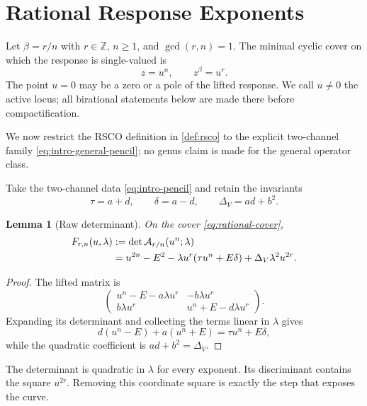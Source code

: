 \documentclass[11pt,reqno]{amsart}
\newtheorem{lemma}[theorem]{Lemma}
\theoremstyle{remark}
\newcommand{\Z}{\mathbb Z}
\newcommand{\cA}{\mathcal A}
\begin{document}
\section{Rational Response Exponents}\label{sec:rational-exponents}

Let $\beta=r/n$ with $r\in\Z$, $n\ge1$, and $\gcd(r,n)=1$.  The
minimal cyclic cover on which the response is single-valued is
\begin{equation}\label{eq:rational-cover}
 z=u^n,\qquad z^\beta=u^r.
\end{equation}
The point $u=0$ may be a zero or a pole of the lifted response.  We call
$u\ne0$ the active locus; all birational statements below are made there
before compactification.

We now restrict the RSCO definition in \cref{def:rsco} to the explicit
two-channel family \eqref{eq:intro-general-pencil}; no genus claim is made for
the general operator class.

Take the two-channel data \eqref{eq:intro-pencil} and retain the invariants
\begin{equation}\label{eq:invariants-repeat}
 \tau=a+d,\qquad \delta=a-d,\qquad \Delta_V=ad+b^2.
\end{equation}

\begin{lemma}[Raw determinant]\label{lem:raw-determinant}
On the cover \eqref{eq:rational-cover},
\begin{align}
 F_{r,n}(u,\lambda)
 &:=
 \det\cA_{r/n}(u^n;\lambda)\notag\\
 &=u^{2n}-E^2
 -\lambda u^r(\tau u^n+E\delta)
 +\Delta_V\lambda^2u^{2r}.
 \label{eq:raw-determinant}
\end{align}
\end{lemma}

\begin{proof}
The lifted matrix is
\[
 \begin{pmatrix}
 u^n-E-a\lambda u^r&-b\lambda u^r\\
 b\lambda u^r&u^n+E-d\lambda u^r
 \end{pmatrix}.
\]
Expanding its determinant and collecting the terms linear in $\lambda$
gives
\[
 d(u^n-E)+a(u^n+E)=\tau u^n+E\delta,
\]
while the quadratic coefficient is $ad+b^2=\Delta_V$.
\end{proof}

The determinant is quadratic in $\lambda$ for every exponent.  Its
discriminant contains the square $u^{2r}$.  Removing this coordinate square
is exactly the step that exposes the curve.
\end{document}
